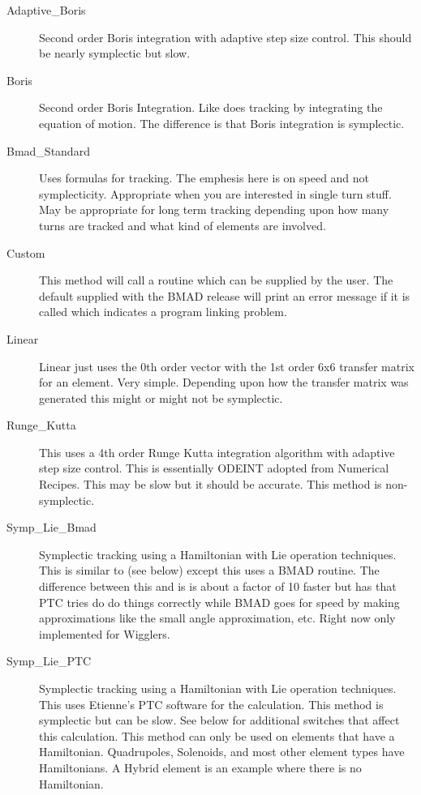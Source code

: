 \begin{description}
\item[Adaptive\_Boris]
Second order Boris integration\cite{boris} with adaptive step size control.
This should be nearly symplectic but slow.

\item[Boris]
Second order Boris Integration. Like   does
tracking by integrating the equation of motion. The difference is that
Boris integration is symplectic.

\item[Bmad\_Standard]
Uses formulas for tracking. The emphesis here is on speed and not
symplecticity. Appropriate when you are interested in single turn
stuff. May be appropriate for long term tracking depending upon how
many turns are tracked and what kind of elements are involved. 

\item[Custom]
This method will call a routine  which can be supplied by
the user. The default  supplied with the BMAD release will
print an error message if it is called which indicates a program linking problem.

\item[Linear]
Linear just uses the 0th order vector with the 1st order 6x6 transfer
matrix for an element. Very simple.  Depending upon how the transfer
matrix was generated this might or might not be symplectic.

\item[Runge\_Kutta]
This uses a 4th order Runge Kutta integration algorithm with adaptive
step size control.  This is essentially ODEINT adopted from Numerical
Recipes\cite{nr}. This may be slow but it should be accurate. This method is
non-symplectic.

\item[Symp\_Lie\_Bmad]
Symplectic tracking using a Hamiltonian with Lie operation techniques.
This is similar to  (see below) except this uses a
BMAD routine.  The difference between this and  is
 is about a factor of 10 faster but 
has
that PTC tries do do things correctly while BMAD goes for speed by
making approximations like the small angle approximation, etc. Right
now only implemented for Wigglers.

\item[Symp\_Lie\_PTC]
Symplectic tracking using a Hamiltonian with Lie operation techniques.
This uses Etienne's PTC software for the calculation. This method is
symplectic but can be slow. See below for additional switches that affect this
calculation. This method can only be used on elements that have a Hamiltonian.
Quadrupoles, Solenoids, and most other element types have Hamiltonians. A
Hybrid element is an  example where there is no Hamiltonian.


\end{description}
